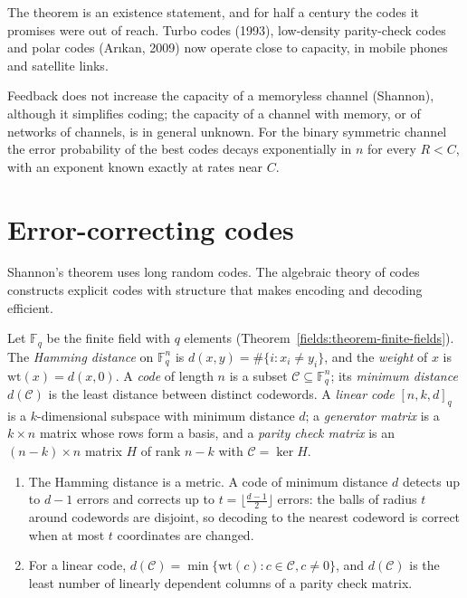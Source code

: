 The theorem is an existence statement, and for half a century the codes it promises were out of reach. Turbo codes (1993), low-density parity-check codes and polar codes (Ar\i kan, 2009) now operate close to capacity, in
mobile phones and satellite links.

\begin{remark}\label{information-theory:remark-feedback}
Feedback does not increase the capacity of a memoryless channel (Shannon), although it simplifies coding; the capacity of a channel with memory, or of networks of channels, is in general unknown. For the binary symmetric
channel the error probability of the best codes decays exponentially in $n$ for every $R < C$, with an exponent known exactly at rates near $C$.
\end{remark}

\section{Error-correcting codes}\label{information-theory:section-error-correcting}

Shannon's theorem uses long random codes. The algebraic theory of codes constructs explicit codes with structure that makes encoding and decoding efficient.

\begin{definition}\label{information-theory:definition-block-code}
Let $\mathbb{F}_q$ be the finite field with $q$ elements (Theorem~\ref{fields:theorem-finite-fields}). The \emph{Hamming distance} on $\mathbb{F}_q^n$ is $d(x, y) = \#\{i : x_i \neq y_i\}$, and the \emph{weight} of $x$ is $\mathrm{wt}(x) = d(x, 0)$. A
\emph{code} of length $n$ is a subset $\mathcal{C} \subseteq \mathbb{F}_q^n$; its \emph{minimum distance} $d(\mathcal{C})$ is the least distance between distinct codewords. A \emph{linear code} $[n, k, d]_q$ is a $k$-dimensional subspace with
minimum distance $d$; a \emph{generator matrix} is a $k \times n$ matrix whose rows form a basis, and a \emph{parity check matrix} is an $(n - k) \times n$ matrix $H$ of rank $n - k$ with $\mathcal{C} = \ker H$.
\end{definition}

\begin{proposition}\label{information-theory:proposition-minimum-distance}
\begin{enumerate}
\item The Hamming distance is a metric. A code of minimum distance $d$ detects up to $d - 1$ errors and corrects up to $t = \lfloor\frac{d - 1}{2}\rfloor$ errors: the balls of radius $t$ around codewords are disjoint, so decoding to the
nearest codeword is correct when at most $t$ coordinates are changed.
\item For a linear code, $d(\mathcal{C}) = \min\{\mathrm{wt}(c) : c \in \mathcal{C}, c \neq 0\}$, and $d(\mathcal{C})$ is the least number of linearly dependent columns of a parity check matrix.
\end{enumerate}
\end{proposition}

